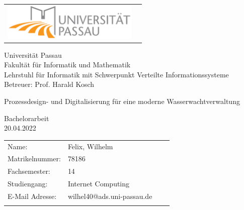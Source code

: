 \documentclass[fontsize=12pt,openright,oneside,paper=a4,BCOR=1cm]{scrbook}
\makeatletter
\newcommand{\authorname}{Felix, Wilhelm}
\newcommand{\immatriculationnumber}{78186}
\newcommand{\studypath}{Internet Computing}
\newcommand{\currentsemester}{14}
\newcommand{\email}{wilhel40@ads.uni-passau.de}
\newcommand{\worktitle}{Prozessdesign- und Digitalisierung für eine moderne Wasserwachtverwaltung}
\newcommand{\thesisdate}{20.04.2022}
\newcommand{\thesisprof}{Prof. Harald Kosch}
\newcommand{\faculty}{Fakultät für Informatik und Mathematik}
\newcommand{\chair}{Lehrstuhl für Informatik mit Schwerpunkt Verteilte Informationssysteme}
\makeatother
\begin{document}

\vspace{1cm}

\begin{center}
\begin{tabular}{lr}
\includegraphics[width=6.5cm]{logouni.pdf}
\end{tabular}

\vspace{1.0cm}
\Large Universität Passau
\\
\Large \faculty
\\
\vspace{0.3cm}
\large \chair
\\
\vspace{0.3cm}
\large Betreuer: \thesisprof
\\


\end{center}


\vspace{1.5cm}

\begin{center}
        {\Huge \worktitle } %
\end{center}
\vspace{1.5cm}
\begin{center}

        {\LARGE Bachelorarbeit}
        \\
        {\large
        \vspace{0.3cm}
        }
        {\large
        \vspace{0.1cm}
        \thesisdate
        }
\end{center}

\vspace{0.8cm}



\vfill {%

\vfill


{\normalsize
\begin{tabular}[l]{llll}
Name:     &  \authorname \\
Matrikelnummer:       & \immatriculationnumber \\
Fachsemester:       & \currentsemester \\
Studiengang:       & \studypath \\
E-Mail Adresse:       & \email \\
\smallskip \\

\end{tabular}}
} \cleardoublepage
\end{document}
